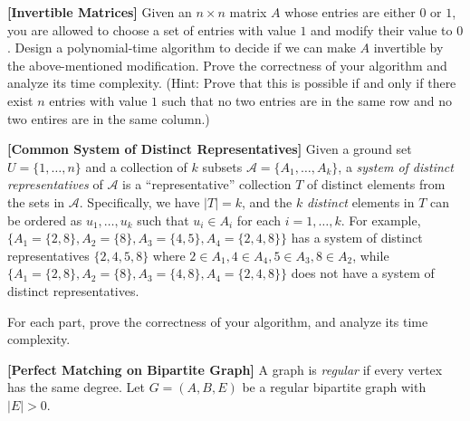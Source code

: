 \documentclass{oxmathproblems}
\begin{document}
\begin{questions}

\miquestion[25] \textbf{[Invertible Matrices]}
Given an $n\times n$ matrix $A$ whose entries are either $0$ or $1$, you are allowed to choose a set of entries with value $1$ and modify their value to $0$. Design a polynomial-time algorithm to decide if we can make $A$ invertible by the above-mentioned modification. Prove the correctness of your algorithm and analyze its time complexity. (Hint: Prove that this is possible if and only if there exist $n$ entries with value $1$ such that no two entries are in the same row and no two entires are in the same column.)

\miquestion[25] \textbf{[Common System of Distinct Representatives]}
Given a ground set $U=\{1,\ldots,n\}$ and a collection of $k$ subsets $\mathcal{A}=\{A_1,\ldots,A_k\}$, a \emph{system of distinct representatives} of $\mathcal{A}$ is a ``representative'' collection $T$ of distinct elements from the sets in $\mathcal{A}$.
Specifically, we have $|T|=k$, and the $k$ \emph{distinct} elements in $T$ can be ordered as $u_1,\ldots,u_k$ such that $u_i\in A_i$ for each $i=1,\ldots,k$.
For example, $\{A_1=\{2,8\},A_2=\{8\},A_3=\{4,5\},A_4=\{2,4,8\}\}$ has a system of distinct representatives $\{2,4,5,8\}$ where $2\in A_1,4\in A_4,5\in A_3,8\in A_2$, while $\{A_1=\{2,8\},A_2=\{8\},A_3=\{4,8\},A_4=\{2,4,8\}\}$ does not have a system of distinct representatives.
For each part, prove the correctness of your algorithm, and analyze its time complexity.

\miquestion[25] \textbf{[Perfect Matching on Bipartite Graph]}
A graph is \emph{regular} if every vertex has the same degree.
Let $G=(A,B,E)$ be a regular bipartite graph with $|E|>0$.
\begin{parts}

\end{parts}
\end{questions}
\end{document}
